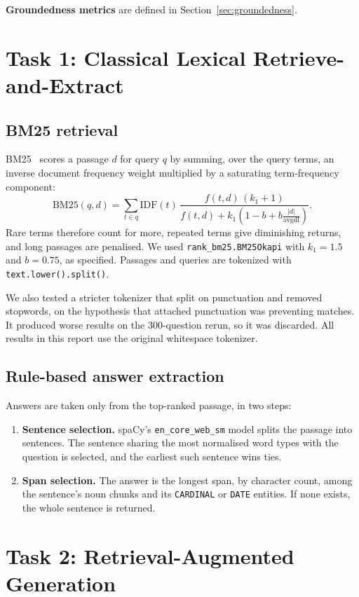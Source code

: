 \documentclass[11pt,a4paper]{article}
\begin{document}
\textbf{Groundedness metrics} are defined in Section~\ref{sec:groundedness}.

\section{Task 1: Classical Lexical Retrieve-and-Extract}

\subsection{BM25 retrieval}
BM25~\cite{bm25} scores a passage $d$ for query $q$ by summing, over the query terms, an inverse document frequency weight multiplied by a saturating term-frequency component:
\begin{equation}
    \text{BM25}(q,d) = \sum_{t \in q} \text{IDF}(t)\,
    \frac{f(t,d)\,(k_1+1)}{f(t,d) + k_1\left(1 - b + b\frac{|d|}{\text{avgdl}}\right)}.
\end{equation}
Rare terms therefore count for more, repeated terms give diminishing returns, and long passages are penalised. We used \texttt{rank\_bm25.BM25Okapi} with $k_1=1.5$ and $b=0.75$, as specified. Passages and queries are tokenized with \texttt{text.lower().split()}.

We also tested a stricter tokenizer that split on punctuation and removed stopwords, on the hypothesis that attached punctuation was preventing matches. It produced worse results on the 300-question rerun, so it was discarded. All results in this report use the original whitespace tokenizer.

\subsection{Rule-based answer extraction}
Answers are taken only from the top-ranked passage, in two steps:
\begin{enumerate}
    \item \textbf{Sentence selection.} spaCy's \texttt{en\_core\_web\_sm} model splits the passage into sentences. The sentence sharing the most normalised word types with the question is selected, and the earliest such sentence wins ties.
    \item \textbf{Span selection.} The answer is the longest span, by character count, among the sentence's noun chunks and its \texttt{CARDINAL} or \texttt{DATE} entities. If none exists, the whole sentence is returned.
\end{enumerate}

\section{Task 2: Retrieval-Augmented Generation}
\end{document}
